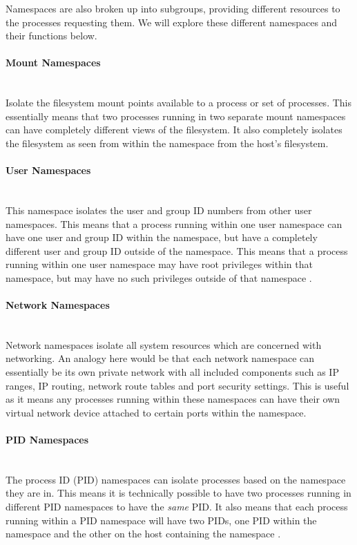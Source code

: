 \documentclass{article}
\begin{document}
Namespaces are also broken up into subgroups, providing different resources to the processes requesting them. We will explore these different namespaces and their functions below.


\paragraph{Mount Namespaces}\mbox{}\\
Isolate the filesystem mount points available to a process or set of processes. This essentially means that two processes running in two separate mount namespaces can have completely different views of the filesystem. It also completely isolates the filesystem as seen from within the namespace from the host's filesystem.

\paragraph{User Namespaces}\mbox{}\\
This namespace isolates the user and group ID numbers from other user namespaces. This means that a process running within one user namespace can have one user and group ID within the namespace, but have a completely different user and group ID outside of the namespace. This means that a process running within one user namespace may have root privileges within that namespace, but may have no such privileges outside of that namespace \citep{Kerrisk2013}.

\paragraph{Network Namespaces}\mbox{}\\
Network namespaces isolate all system resources which are concerned with networking. An analogy here would be that each network namespace can essentially be its own private network with all included components such as IP ranges, IP routing, network route tables and port security settings. This is useful as it means any processes running within these namespaces can have their own virtual network device attached to certain ports within the namespace.

\paragraph{PID Namespaces}\mbox{}\\
The process ID (PID) namespaces can isolate processes based on the namespace they are in. This means it is technically possible to have two processes running in different PID namespaces to have the \textit{same} PID. It also means that each process running within a PID namespace will have two PIDs, one PID within the namespace and the other on the host containing the namespace \citep{Kerrisk2013}.
\end{document}

